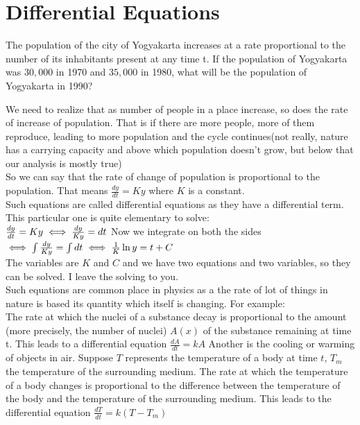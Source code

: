 \section{Differential Equations}
\begin{example}
    The population of the city of Yogyakarta increases at a rate proportional to the number of its inhabitants present at any time t. If the population of Yogyakarta was $30,000$ in 1970 and $35,000$ in 1980, what will be the population of Yogyakarta in 1990?
\end{example}
We need to realize that as number of people in a place increase, so does the rate of increase of population. That is if there are more people, more of them reproduce, leading to more population and the cycle continues(not really, nature has a carrying capacity and above which population doesn't grow, but below that our analysis is mostly true)\\
So we can say that the rate of change of population is proportional to the population. That means $\frac{dy}{dt}=Ky$ where $K$ is a constant.\\
Such equations are called differential equations as they have a differential term. This particular one is quite elementary to solve:\\
$\frac{dy}{dt}=Ky\\
\iff \frac{dy}{Ky}=dt$ Now we integrate on both the sides\\
$\iff \int \frac{dy}{Ky}=\int dt\\
\iff \frac{1}{K} \ln{y}=t+C$\\
The variables are $K$ and $C$ and we have two equations and two variables, so they can be solved. I leave the solving to you.\\
Such equations are common place in physics as a the rate of lot of things in nature is based its quantity which itself is changing. For example:\\
The rate at which the nuclei of a substance decay is proportional to the amount (more precisely, the number of nuclei) $A(x)$ of the substance remaining at time t. This leads to a differential equation $\frac{dA}{dt}=kA$
Another is the cooling or warming of objects in air. Suppose $T$ represents the temperature of a body at time $t$, $T_m$ the temperature of the surrounding medium. The rate at which the temperature of a body changes is proportional to the difference between the temperature of the body and the temperature of the surrounding medium. This leads to the differential equation $\frac{dT}{dt}= k(T-T_m)$\\
